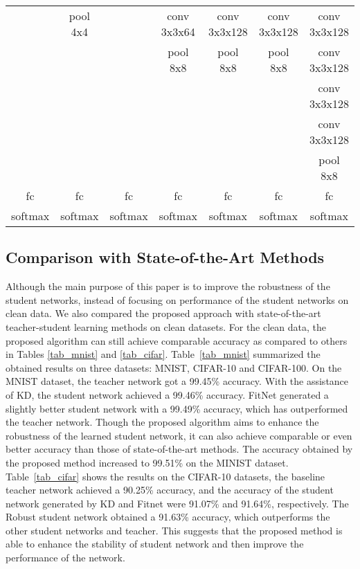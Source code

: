 \documentclass[journal]{IEEEtran}
\newcommand{\Tref}[1]{Table~\ref{#1}}
\begin{document}
\begin{table*}[htb]
\begin{tabular}{|c|c|c|c|c|c|c|}
           &  pool 4x4     &               &  conv 3x3x64  &  conv 3x3x128 &  conv 3x3x128 &  conv 3x3x128  \\
           &               &               &  pool 8x8     &  pool 8x8     &  pool 8x8     &  conv 3x3x128  \\
           &               &               &               &               &               &  conv 3x3x128  \\
           &               &               &               &               &               &  conv 3x3x128  \\
           &               &               &               &               &               &  pool 8x8      \\
\hline
fc  &  fc  &  fc  &  fc  &  fc  &  fc  &  fc  \\
softmax  &  softmax  &  softmax  &  softmax  &  softmax  &  softmax  &  softmax  \\
\hline
\end{tabular}
\label{tab_arch_4}
\end{table*}


\subsection{Comparison with State-of-the-Art Methods}
Although the main purpose of this paper is to improve the robustness of the student networks, instead of focusing on performance of the student networks on clean data. We also compared the proposed approach with state-of-the-art teacher-student learning methods on clean datasets. For the clean data, the proposed algorithm can still achieve comparable accuracy as compared to others in Tables \ref{tab_mnist} and \ref{tab_cifar}. \Tref{tab_mnist} summarized the obtained results on three datasets: MNIST, CIFAR-10 and CIFAR-100. On the MNIST dataset, the teacher network got a 99.45\% accuracy. With the assistance of KD, the student network achieved a 99.46\% accuracy. FitNet generated a slightly better student network with a 99.49\% accuracy, which has outperformed the teacher network. Though the proposed algorithm aims to enhance the robustness of the learned student network, it can also achieve comparable or even better accuracy than those of state-of-the-art methods. The accuracy obtained by the proposed method increased to 99.51\% on the MINIST dataset. 
\Tref{tab_cifar} shows the results on the CIFAR-10 datasets, the baseline teacher network achieved a 90.25\% accuracy, and the accuracy of the student network generated by KD and Fitnet were 91.07\% and 91.64\%, respectively. The Robust student network obtained a 91.63\% accuracy, which outperforms the other student networks and teacher. This suggests that the proposed method is able to enhance the stability of student network and then improve the performance of the network.
\end{document}
